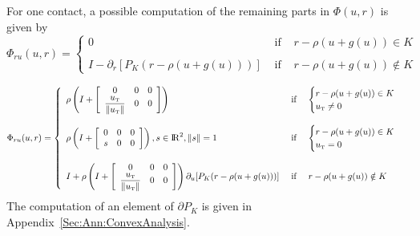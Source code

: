 \label{Sec:Phi-natural-typeII}
 For one contact, a possible computation of the remaining parts in $\Phi(u, r)$  is given by
\begin{equation}
  \label{eq:Phi-natural-typeII-rr}
   \Phi_{r u}(u,r)  = 
  \left\{
    \begin{array}{lcl}
      0  & \text { if } & r- \rho(u+g(u)) \in K    \\ \\
      I - \partial_{r}[P_K(r-\rho(u+g(u)))]  & \text { if } &r- \rho(u+g(u))   \notin K
    \end{array}\right.
\end{equation}

\begin{equation}
  \label{eq:Phi-natural-typeII-ru}
  \Phi_{r u}(u,r) = 
  \left\{
    \begin{array}{lcl}
      \rho \left(I +
      \left[\begin{array}{ccc}
          0 & 0 & 0 \\
          \Frac{u_\t}{\|u_\t\|} & 0 & 0 \\
        \end{array}\right]
      \right)  & \text { if } &
      \begin{cases}
        r- \rho(u+g(u)) \in K \\ u_\t \neq 0
      \end{cases}
      \\ \\
      \rho\left(I +  \left[\begin{array}{ccc}
          0 & 0 & 0 \\
          s & 0 & 0 \\
        \end{array}\right]\right), s \in \RR^2 , \|s\|=1  & \text { if } &
    \begin{cases}
      r- \rho(u+g(u)) \in K \\ u_\t = 0
    \end{cases}
    \\ \\
      I        +\rho \left(I +  \left[\begin{array}{ccc}
          0 & 0 & 0 \\
          \Frac{u_\t}{\|u_\t\|} & 0 & 0 \\
        \end{array}\right]\right)    \partial_{u}[P_K(r-\rho(u+g(u)))] & \text { if } &r- \rho(u+g(u))   \notin K
    \end{array}\right.
\end{equation}
The computation of an element of $\partial P_K$ is given in Appendix~\ref{Sec:Ann:ConvexAnalysis}.


